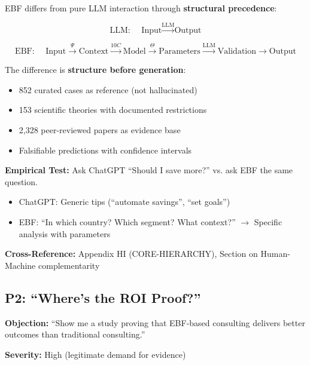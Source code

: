 \begin{axiom}
EBF differs from pure LLM interaction through \textbf{structural precedence}:

\begin{equation}
\text{LLM: } \quad \text{Input} \xrightarrow{\text{LLM}} \text{Output}
\end{equation}

\begin{equation}
\text{EBF: } \quad \text{Input} \xrightarrow{\Psi} \text{Context} \xrightarrow{10C} \text{Model} \xrightarrow{\Theta} \text{Parameters} \xrightarrow{\text{LLM}} \text{Validation} \rightarrow \text{Output}
\end{equation}

The difference is \textbf{structure before generation}:
\begin{itemize}[nosep]
    \item 852 curated cases as reference (not hallucinated)
    \item 153 scientific theories with documented restrictions
    \item 2,328 peer-reviewed papers as evidence base
    \item Falsifiable predictions with confidence intervals
\end{itemize}
\end{axiom}

\textbf{Empirical Test:} Ask ChatGPT ``Should I save more?'' vs. ask EBF the same question.
\begin{itemize}[nosep]
    \item ChatGPT: Generic tips (``automate savings'', ``set goals'')
    \item EBF: ``In which country? Which segment? What context?'' $\rightarrow$ Specific analysis with parameters
\end{itemize}

\textbf{Cross-Reference:} Appendix HI (CORE-HIERARCHY), Section on Human-Machine complementarity

\subsection{P2: ``Where's the ROI Proof?''}
\label{sec:da-p2}

\begin{tcolorbox}[colback=gray!5!white, colframe=gray!75!black]
\textbf{Objection:} ``Show me a study proving that EBF-based consulting
delivers better outcomes than traditional consulting.''

\textbf{Severity:} High (legitimate demand for evidence)
\end{tcolorbox}

